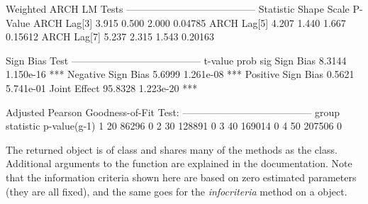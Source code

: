 \begin{Schunk}
\begin{Soutput}
Weighted ARCH LM Tests
---------------------------------------
            Statistic Shape Scale P-Value
ARCH Lag[3]     3.915 0.500 2.000 0.04785
ARCH Lag[5]     4.207 1.440 1.667 0.15612
ARCH Lag[7]     5.237 2.315 1.543 0.20163


Sign Bias Test
---------------------------------------
                   t-value      prob sig
Sign Bias           8.3144 1.150e-16 ***
Negative Sign Bias  5.6999 1.261e-08 ***
Positive Sign Bias  0.5621 5.741e-01
Joint Effect       95.8328 1.223e-20 ***


Adjusted Pearson Goodness-of-Fit Test:
---------------------------------------
  group statistic p-value(g-1)
1    20     86296            0
2    30    128891            0
3    40    169014            0
4    50    207506            0
\end{Soutput}
\end{Schunk}
The returned object is of class \verb@uGARCHfilter@ and shares many of the methods
as the \verb@uGARCHfit@ class. Additional arguments to the function are explained
in the documentation. Note that the information criteria shown here are based on
zero estimated parameters (they are all fixed), and the same goes for the
\emph{infocriteria} method on a \verb@uGARCHfilter@ object.

